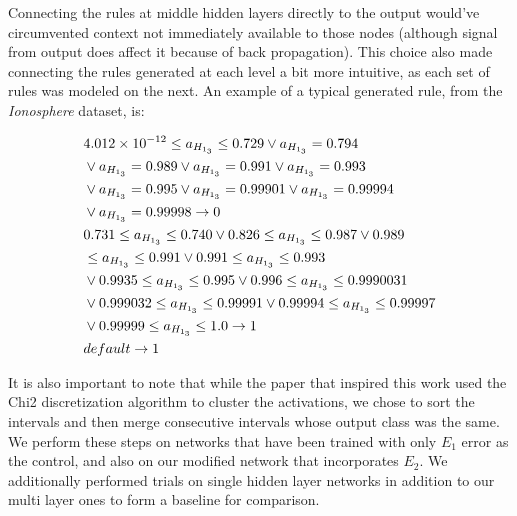  Connecting the rules at middle hidden layers directly to the output
 would’ve circumvented context not immediately available to those
 nodes (although signal from output does affect it because of back
 propagation). This choice also made connecting the rules generated at
 each level a bit more intuitive, as each set of rules was modeled on
 the next. An example of a typical generated rule, from the \textit{Ionosphere} dataset, is:
 \begin{table}[]
 \begin{align}
 \notag &4.012\times 10^{-12} \le a_{H_{1_3}} \le 0.729 \vee a_{H_{1_3}} = 0.794 \\ \notag &\vee a_{H_{1_3}} = 0.989 \vee a_{H_{1_3}} = 0.991 \vee a_{H_{1_3}} = 0.993 \\ \notag & \vee a_{H_{1_3}} = 0.995 \vee a_{H_{1_3}} = 0.99901 \vee a_{H_{1_3}} = 0.99994 \\ \notag & \vee a_{H_{1_3}} = 0.99998 \rightarrow 0 \\
 \notag &0.731 \le a_{H_{1_3}} \le 0.740 \vee 0.826 \le a_{H_{1_3}} \le 0.987 \vee 0.989  \\ \notag & \le a_{H_{1_3}} \le 0.991 \vee 0.991 \le a_{H_{1_3}} \le 0.993  \\ \notag & \vee 0.9935 \le a_{H_{1_3}} \le 0.995 \vee 0.996 \le a_{H_{1_3}} \le 0.9990031  \\ \notag & \vee 0.999032 \le a_{H_{1_3}} \le 0.99991 \vee 0.99994 \le a_{H_{1_3}} \le 0.99997  \\ \notag & \vee 0.99999 \le a_{H_{1_3}} \le 1.0 \rightarrow 1 \\
 \notag &default \rightarrow 1
 \end{align}
 \end{table}

It is also important to note that while the paper
that inspired this work \cite{thuan11} used the Chi2 discretization
algorithm to cluster the activations, we chose to sort the intervals
and then merge consecutive intervals whose output class was the same. We perform these steps on networks that have been trained with only $E_1$
error as the control, and also on our modified network that
incorporates $E_2$. We additionally performed trials on single hidden
layer networks in addition to our multi layer ones to form a baseline
for comparison. 

